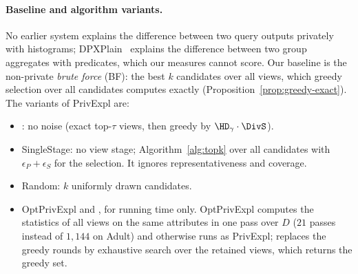 \paragraph{Baseline and algorithm variants.}
No earlier system explains the difference between two query outputs privately with histograms; DPXPlain~\cite{TaoGMR22} explains the difference between two group aggregates with predicates, which our measures cannot score.
Our baseline is the non-private \emph{brute force} (\textsf{BF}): the best $k$ candidates over all views, which greedy selection over all candidates computes exactly (Proposition~\ref{prop:greedy-exact}).
The variants of \textsf{PrivExpl} are:
\begin{itemize}[leftmargin=*,itemsep=1pt,topsep=2pt]
  \item \Bone{}: no noise (exact top-$\tau$ views, then greedy by $\HD_\gamma\cdot\DivS$).
  \item \textsf{SingleStage}: no view stage; Algorithm~\ref{alg:topk} over all candidates with $\epsilon_P+\epsilon_S$ for the selection. It ignores representativeness and coverage.
  \item \textsf{Random}: $k$ uniformly drawn candidates.
  \item \textsf{OptPrivExpl} and \Btwo{}, for running time only. \textsf{OptPrivExpl} computes the statistics of all views on the same attributes in one pass over $D$ ($21$ passes instead of $1{,}144$ on Adult) and otherwise runs as \textsf{PrivExpl}; \Btwo{} replaces the greedy rounds by exhaustive search over the retained views, which returns the greedy set.
\end{itemize}

